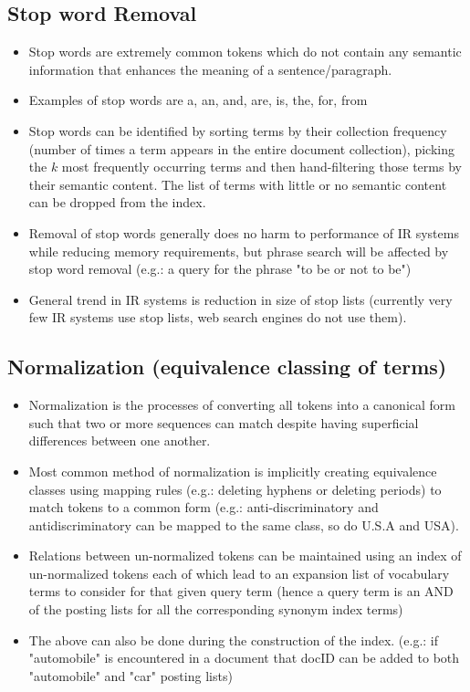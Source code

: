 \documentclass{article}
\begin{document}
\subsection{Stop word Removal}
\begin{itemize}
    \item Stop words are extremely common tokens which do not contain any semantic information that enhances the meaning of a sentence/paragraph. 
    
    \item Examples of stop words are a, an, and, are, is, the, for, from
    
    \item Stop words can be identified by sorting terms by their collection frequency (number of times a term appears in the entire document collection), picking the $k$ most frequently occurring terms and then hand-filtering those terms by their semantic content. The list of terms with little or no semantic content can be dropped from the index. 
    
    \item Removal of stop words generally does no harm to performance of IR systems while reducing memory requirements, but phrase search will be affected by stop word removal (e.g.: a query for the phrase "to be or not to be")
    
    \item General trend in IR systems is reduction in size of stop lists (currently very few IR systems use stop lists, web search engines do not use them). 
\end{itemize}

\subsection{Normalization (equivalence classing of terms)}
\begin{itemize}
    \item Normalization is the processes of converting all tokens into a canonical form such that two or more sequences can match despite having superficial differences between one another. 
    
    \item Most common method of normalization is implicitly creating equivalence classes using mapping rules (e.g.: deleting hyphens or deleting periods) to match tokens to a common form (e.g.: anti-discriminatory and antidiscriminatory can be mapped to the same class, so do U.S.A and USA).
    
    \item Relations between un-normalized tokens can be maintained using an index of un-normalized tokens each of which lead to an expansion list of vocabulary terms to consider for that given query term (hence a query term is an AND of the posting lists for all the corresponding synonym index terms)
    
    \item The above can also be done during the construction of the index. (e.g.: if "automobile" is encountered in a document that docID can be added to both "automobile" and "car" posting lists)
\end{itemize}
\end{document}
